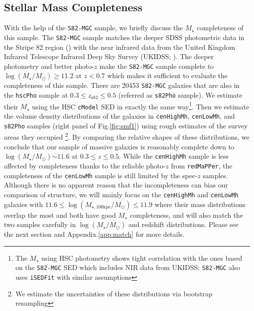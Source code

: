 \documentclass{emulateapj}
\def\redm{\texttt{redMaPPer}}
\def\rbcg{\texttt{cenHighMh}}
\def\nbcg{\texttt{cenLowMh}}
\def\mstar{{$M_{\star}$}}
\def\logms{{$\log (M_{\star}/M_{\odot})$}}
\def\logmtot{{$\log (M_{\star,100\mathrm{kpc}}/M_{\odot})$}}
\begin{document}
\begin{CJK*}{UTF8}{gbsn}
    \subsection{Stellar Mass Completeness}
    \label{ssec:complete}
    
    With the help of the \texttt{S82-MGC} sample, we briefly discuss the \mstar{} 
    completeness of this sample. 
    The \texttt{S82-MGC} sample matches the deeper SDSS photometric data in the 
    Stripe 82 region (\citealt{Annis2014}) with the near infrared data from the United 
    Kingdom Infrared Telescope Infrared Deep Sky Survey (UKIDSS; \citealt{Lawrence2007}). 
    The deeper photometry and better photo-$z$ make the \texttt{S82-MGC} sample complete 
    to \logms{}$\geq 11.2$ at $z<0.7$ which makes it sufficient to evaluate the 
    completeness of this sample.
    There are 20453 \texttt{S82-MGC} galaxies that are also in the \texttt{hscPho} 
    sample at $0.3 \leq z_{\mathrm{s82}} \leq 0.5$ (referred as \texttt{s82Pho} sample).   
    We estimate their \mstar{} using the HSC \texttt{cModel} SED in exactly the 
    same way\footnote{The \mstar{} using HSC photometry shows tight correlation with the 
    ones based on the \texttt{S82-MGC} SED which includes NIR data from UKIDSS; 
    \texttt{S82-MGC} also uses \texttt{iSEDFit} with similar assumptions}.  
    Then we estimate the volume density distributions of the galaxies in \rbcg{}, 
    \nbcg{}, and \texttt{s82Pho} samples (right panel of Fig.\ref{fig:smf1}) using 
    rough estimates of the survey areas they occupied \footnote{We estimate the 
    uncertainties of these distributions via bootstrap resampling}.
    By comparing the relative shapes of these distributions, we conclude that 
    our sample of massive galaxies is reasonably complete down to \logms{}$\sim 11.6$
    at $0.3 \leq z \leq 0.5$. 
    While the \rbcg{} sample is less affected by completeness thanks to the reliable
    photo-$z$ from \redm{}, the completeness of the \nbcg{} sample is still limited 
    by the spec-$z$ samples.
    Although there is no apparent reason that the incompleteness can bias our 
    comparison of structure, we will mainly focus on the \rbcg{} and \nbcg{} galaxies 
    with $11.6 \le$\logmtot{}$\le 11.9$ where their mass distributions overlap the 
    most and both have good \mstar{} completeness, and will also match the two samples 
    carefully in \logms{} and redshift distributions.
    Please see the next section and Appendix.\ref{app:match} for more details.


\end{CJK*}
\end{document}

